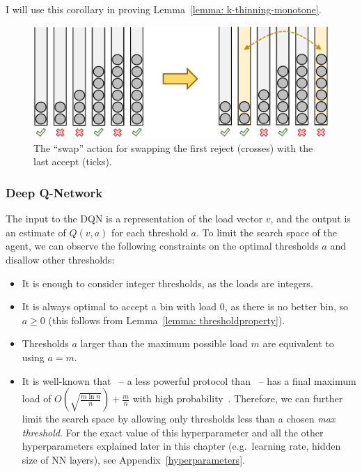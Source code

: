 I will use this corollary in proving Lemma~\ref{lemma: k-thinning-monotone}.


\begin{figure}
    \centering
    \includegraphics[scale=0.5]{Chapter3/Figs/two_thinning_swap.pdf}
    \caption{The ``swap'' action for \TwoThinning swapping the first reject (crosses) with the last accept (ticks).}
    \label{two-thinning-swap-action}
\end{figure}


\subsubsection*{Deep Q-Network} \label{DQN}

The input to the DQN is a representation of the load vector $v$, and the output is an estimate of $Q(v, a)$ for each threshold $a$. To limit the search space of the agent, we can observe the following constraints on the optimal thresholds $a$ and disallow other thresholds:

\begin{itemize}
    \item It is enough to consider integer thresholds, as the loads are integers.
    \item It is always optimal to accept a bin with load $0$, as there is no better bin, so $a\geq 0$ (this follows from Lemma~\ref{lemma: thresholdproperty}).
    \item Thresholds $a$ larger than the maximum possible load $m$ are equivalent to using $a=m$.
    \item It is well-known that \OneChoice\ -- a less powerful protocol than \TwoThinning\ -- has a final maximum load of $O(\sqrt{\frac{m\ln n}{n}})+\frac{m}{n}$ with high probability~\cite{raab1998onechoice}. Therefore, we can further limit the search space by allowing only thresholds less than a chosen \textit{max threshold}. For the exact value of this hyperparameter and all the other hyperparameters explained later in this chapter (e.g.\ learning rate, hidden size of NN layers), see Appendix~\ref{hyperparameters}.
    
\end{itemize}


